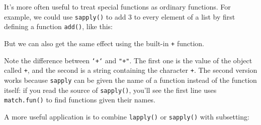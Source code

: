 It's more often useful to treat special functions as ordinary functions.
For example, we could use \texttt{sapply()} to add 3 to every element of
a list by first defining a function \texttt{add()}, like this:

\begin{Shaded}
\begin{Highlighting}[]
\StringTok{ }\StringTok{ }
\NormalTok{(}\NormalTok{:}\NormalTok{)}
\end{Highlighting}
\end{Shaded}

But we can also get the same effect using the built-in \texttt{+}
function.

\begin{Shaded}
\begin{Highlighting}[]
\NormalTok{(}\NormalTok{:}\NormalTok{, }\DataTypeTok{+}\NormalTok{, }\NormalTok{)}
\NormalTok{(}\NormalTok{:}\NormalTok{, }\NormalTok{, }\NormalTok{)}
\end{Highlighting}
\end{Shaded}

Note the difference between \texttt{`+`} and \texttt{"+"}. The first one
is the value of the object called \texttt{+}, and the second is a string
containing the character \texttt{+}. The second version works because
\texttt{sapply} can be given the name of a function instead of the
function itself: if you read the source of \texttt{sapply()}, you'll see
the first line uses \texttt{match.fun()} to find functions given their
names.

A more useful application is to combine \texttt{lapply()} or
\texttt{sapply()} with subsetting:

\begin{Shaded}
\begin{Highlighting}[]
\StringTok{ }\NormalTok{(}\NormalTok{:}\NormalTok{, }\NormalTok{:}\NormalTok{, }\NormalTok{:}\NormalTok{)}
\StringTok{"["}\NormalTok{, }\NormalTok{)}

\NormalTok{(x, function(x) x[}\NormalTok{])}
\end{Highlighting}
\end{Shaded}


